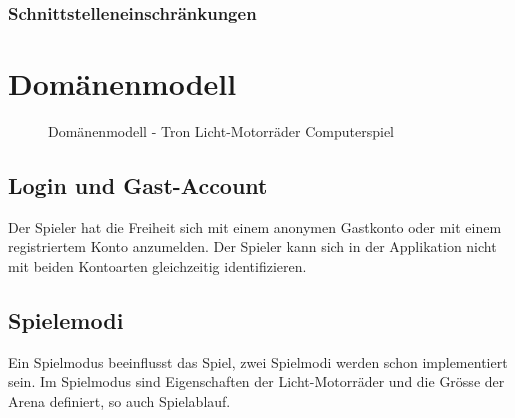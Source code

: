 \documentclass[11pt,ngerman]{article}
\begin{document}
        \subsubsection{Schnittstelleneinschränkungen}

    \section{Domänenmodell}
    \begin{figure}[H]
        \centering
        \caption{Domänenmodell - Tron Licht-Motorräder Computerspiel}
        \label{fig:DomainModel_TronLightCycles}
    \end{figure}
	\subsection{Login und Gast-Account}
		Der Spieler hat die Freiheit sich mit einem anonymen Gastkonto  oder mit einem registriertem Konto anzumelden. Der Spieler kann sich in der Applikation nicht mit beiden Kontoarten gleichzeitig identifizieren.

	\subsection{Spielemodi}
		Ein Spielmodus beeinflusst das Spiel, zwei Spielmodi werden schon implementiert sein. Im Spielmodus sind Eigenschaften der Licht-Motorräder und die Grösse der Arena definiert, so auch Spielablauf.
\end{document}

